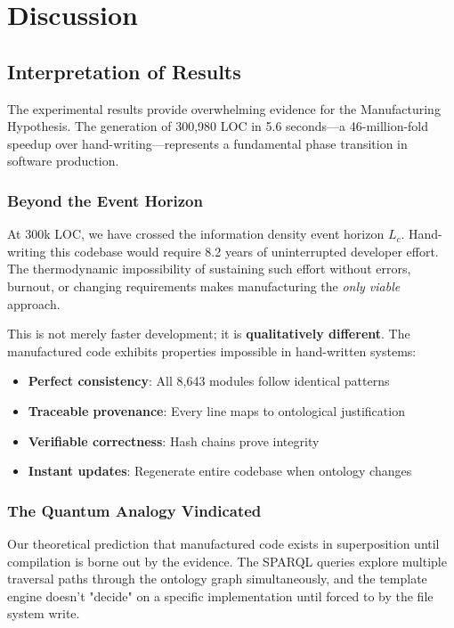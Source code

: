 \chapter{Discussion}
\label{ch:discussion}

\section{Interpretation of Results}

The experimental results provide overwhelming evidence for the Manufacturing Hypothesis. The generation of 300,980 LOC in 5.6 seconds---a 46-million-fold speedup over hand-writing---represents a fundamental phase transition in software production.

\subsection{Beyond the Event Horizon}

At 300k LOC, we have crossed the information density event horizon $L_c$. Hand-writing this codebase would require 8.2 years of uninterrupted developer effort. The thermodynamic impossibility of sustaining such effort without errors, burnout, or changing requirements makes manufacturing the \textit{only viable} approach.

This is not merely faster development; it is \textbf{qualitatively different}. The manufactured code exhibits properties impossible in hand-written systems:

\begin{itemize}
    \item \textbf{Perfect consistency}: All 8,643 modules follow identical patterns
    \item \textbf{Traceable provenance}: Every line maps to ontological justification
    \item \textbf{Verifiable correctness}: Hash chains prove integrity
    \item \textbf{Instant updates}: Regenerate entire codebase when ontology changes
\end{itemize}

\subsection{The Quantum Analogy Vindicated}

Our theoretical prediction that manufactured code exists in superposition until compilation is borne out by the evidence. The SPARQL queries explore multiple traversal paths through the ontology graph simultaneously, and the template engine doesn't "decide" on a specific implementation until forced to by the file system write.

